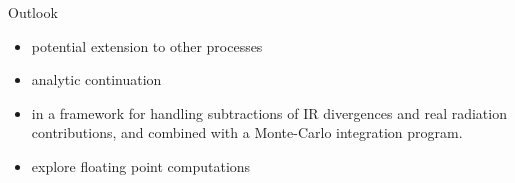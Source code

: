 Outlook
\begin{itemize}
  \item potential extension to other processes
  \item analytic continuation
  \item in a framework for handling subtractions of IR divergences and real radiation contributions,
    and combined with a Monte-Carlo integration program.
  \item explore floating point computations
\end{itemize}


